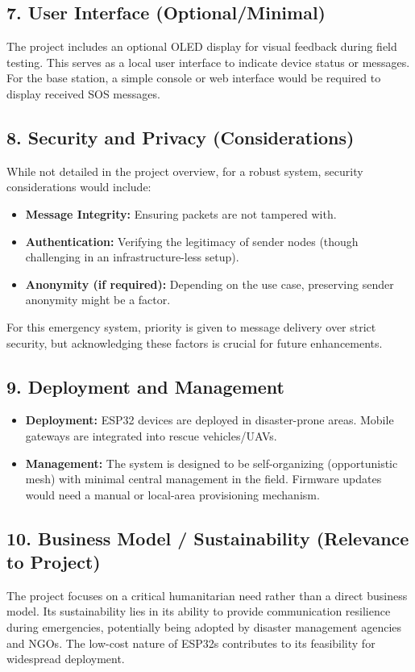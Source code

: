 \documentclass[12pt, a4paper]{article}
\begin{document}
\subsection{7. User Interface (Optional/Minimal)}
The project includes an optional OLED display for visual feedback during field testing. This serves as a local user interface to indicate device status or messages. For the base station, a simple console or web interface would be required to display received SOS messages.

\subsection{8. Security and Privacy (Considerations)}
While not detailed in the project overview, for a robust system, security considerations would include:
\begin{itemize}
    \item \textbf{Message Integrity:} Ensuring packets are not tampered with.
    \item \textbf{Authentication:} Verifying the legitimacy of sender nodes (though challenging in an infrastructure-less setup).
    \item \textbf{Anonymity (if required):} Depending on the use case, preserving sender anonymity might be a factor.
\end{itemize}
For this emergency system, priority is given to message delivery over strict security, but acknowledging these factors is crucial for future enhancements.

\subsection{9. Deployment and Management}
\begin{itemize}
    \item \textbf{Deployment:} ESP32 devices are deployed in disaster-prone areas. Mobile gateways are integrated into rescue vehicles/UAVs.
    \item \textbf{Management:} The system is designed to be self-organizing (opportunistic mesh) with minimal central management in the field. Firmware updates would need a manual or local-area provisioning mechanism.
\end{itemize}

\subsection{10. Business Model / Sustainability (Relevance to Project)}
The project focuses on a critical humanitarian need rather than a direct business model. Its sustainability lies in its ability to provide communication resilience during emergencies, potentially being adopted by disaster management agencies and NGOs. The low-cost nature of ESP32s contributes to its feasibility for widespread deployment.
\end{document}
